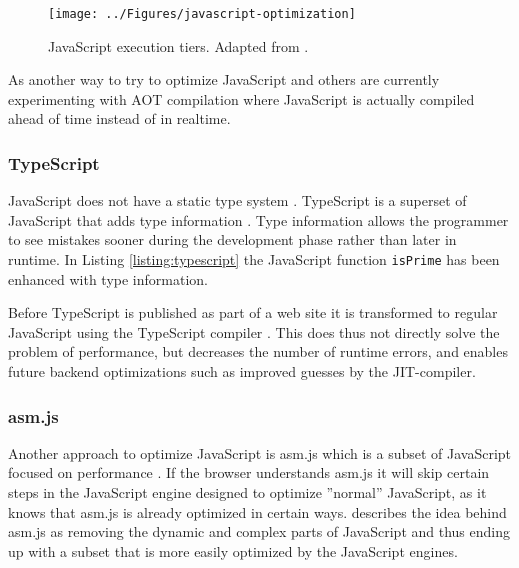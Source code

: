 \begin{figure}[!h]
\centering
\texttt{[image: ../Figures/javascript-optimization]}
\caption{JavaScript execution tiers. Adapted from \textcite{ParkKimMoon2017,ZhuykovVardanyanMelnikBuchatskiySharygin2015}.}
\label{javascript-optimization}
\end{figure}        

As another way to try to optimize JavaScript \textcite{ParkJungMoon2015,ZhuykovVardanyanMelnikBuchatskiySharygin2015} and others are currently experimenting with AOT compilation where JavaScript is actually compiled ahead of time instead of in realtime.

\subsubsection{TypeScript}

JavaScript does not have a static type system \parencite{Park2014}. TypeScript is a superset of JavaScript that adds type information \parencite{DeWolffHage2017}. Type information allows the programmer to see mistakes sooner during the development phase rather than later in runtime. In Listing \ref{listing:typescript} the JavaScript function \texttt{isPrime} has been enhanced with type information.



Before TypeScript is published as part of a web site it is transformed to regular JavaScript using the TypeScript compiler \parencite{ReiserBlaser2017}. This does thus not directly solve the problem of performance, but decreases the number of runtime errors, and enables future backend optimizations such as improved guesses by the JIT-compiler.

\subsubsection{asm.js}

Another approach to optimize JavaScript is asm.js which is a subset of JavaScript focused on performance \parencite{Zakai2018}. If the browser understands asm.js it will skip certain steps in the JavaScript engine designed to optimize ''normal'' JavaScript, as it knows that asm.js is already optimized in certain ways. \textcite{Zakai2018} describes the idea behind asm.js as removing the dynamic and complex parts of JavaScript and thus ending up with a subset that is more easily optimized by the JavaScript engines.

